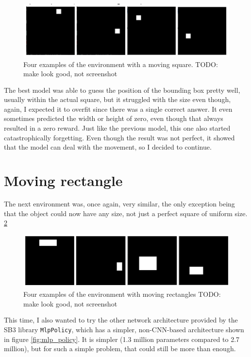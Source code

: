 \documentclass[
  digital,     %
  oneside,     %
  nosansbold,  %
  nocolorbold, %
  lof,         %
  lot,         %
]{fithesis4}
\begin{document}
\begin{figure}
    \includegraphics[width=1\linewidth]{env_examples/env1.png}
    \caption{Four examples of the environment with a moving square. TODO: make look good, not screenshot}
    \label{fig:env1}
\end{figure}

The best model was able to guess the position of the bounding box pretty well, usually within the actual square, but it struggled with the size even though, again, I expected it to overfit since there was a single correct answer. It even sometimes predicted the width or height of zero, even though that always resulted in a zero reward. Just like the previous model, this one also started catastrophically forgetting. Even though the result was not perfect, it showed that the model can deal with the movement, so I decided to continue.

\section{Moving rectangle}
\label{subsec:moving_rectangle}
The next environment was, once again, very similar, the only exception being that the object could now have any size, not just a perfect square of uniform size. \ref{fig:env2}

\begin{figure}
    \includegraphics[width=1\linewidth]{env_examples/env2.png}
    \caption{Four examples of the environment with moving rectangles TODO: make look good, not screenshot}
    \label{fig:env2}
\end{figure}

This time, I also wanted to try the other network architecture provided by the SB3 library \texttt{MlpPolicy}, which has a simpler, non-CNN-based architecture shown in figure \ref{fig:mlp_policy}. It is simpler (1.3 million parameters compared to 2.7 million), but for such a simple problem, that could still be more than enough.
\end{document}
